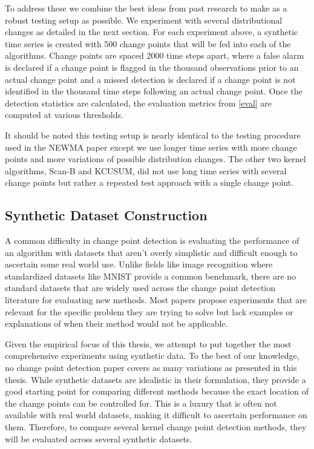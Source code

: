 To address these we combine the best ideas from past research to make as a robust testing setup as possible. We experiment with several distributional changes as detailed in the next section. For each experiment above, a synthetic time series is created with 500 change points that will be fed into each of the algorithms. Change points are spaced 2000 time steps apart, where a false alarm is declared if a change point is flagged in the thousand observations prior to an actual change point and a missed detection is declared if a change point is not identified in the thousand time steps following an actual change point. Once the detection statistics are calculated, the evaluation metrics from \ref{eval} are computed at various thresholds. 

It should be noted this testing setup is nearly identical to the testing procedure used in the NEWMA paper except we use longer time series with more change points and more variations of possible distribution changes. The other two kernel algorithms, Scan-B and KCUSUM, did not use long time series with several change points but rather a repeated test approach with a single change point. 

\subsection{Synthetic Dataset Construction}
A common difficulty in change point detection is evaluating the performance of an algorithm with datasets that aren't overly simplistic and difficult enough to ascertain some real world use. Unlike fields like image recognition where standardized datasets like MNIST provide a common benchmark, there are no standard datasets that are widely used across the change point detection literature for evaluating new methods. Most papers propose experiments that are relevant for the specific problem they are trying to solve  but lack examples or explanations of when their method would not be applicable.  %

Given the empirical focus of this thesis, we attempt to put together the most comprehensive experiments using synthetic data. To the best of our knowledge, no change point detection paper covers as many variations as presented in this thesis. While synthetic datasets are idealistic in their formulation, they provide a good starting point for comparing different methods because the exact location of the change points can be controlled for. This is a luxury that is often not available with real world datasets, making it difficult to ascertain performance on them. Therefore, to compare several kernel change point detection methods, they will be evaluated across several synthetic datasets.


